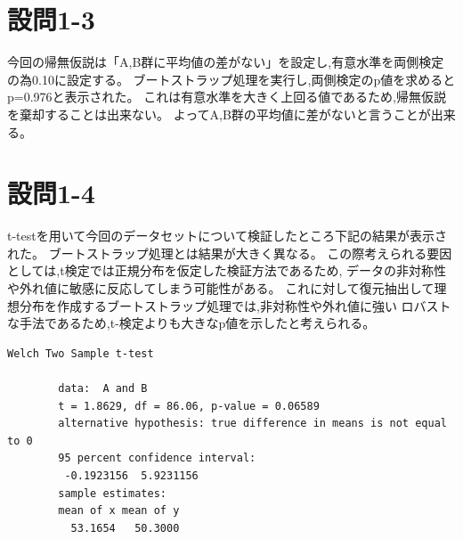 \documentclass[fontsize = 10pt, paper= a4,twocolumn,column_gap=5zw]{jlreq}
\begin{document}
\section{設問1-3}
    今回の帰無仮説は「A,B群に平均値の差がない」を設定し,有意水準を両側検定の為0.10に設定する。
    ブートストラップ処理を実行し,両側検定のp値を求めるとp=0.976と表示された。
    これは有意水準を大きく上回る値であるため,帰無仮説を棄却することは出来ない。
    よってA,B群の平均値に差がないと言うことが出来る。

\section{設問1-4}
    t-testを用いて今回のデータセットについて検証したところ下記の結果が表示された。
    ブートストラップ処理とは結果が大きく異なる。
    この際考えられる要因としては,t検定では正規分布を仮定した検証方法であるため,
    データの非対称性や外れ値に敏感に反応してしまう可能性がある。
    これに対して復元抽出して理想分布を作成するブートストラップ処理では,非対称性や外れ値に強い
    ロバストな手法であるため,t-検定よりも大きなp値を示したと考えられる。
    \begin{lstlisting}[basicstyle=\ttfamily\footnotesize, frame=single, caption=s2212022-1.c ,label=s2212022-1.c]
        Welch Two Sample t-test

        data:  A and B
        t = 1.8629, df = 86.06, p-value = 0.06589
        alternative hypothesis: true difference in means is not equal to 0
        95 percent confidence interval:
         -0.1923156  5.9231156
        sample estimates:
        mean of x mean of y 
          53.1654   50.3000 
        \end{lstlisting}
\end{document}
